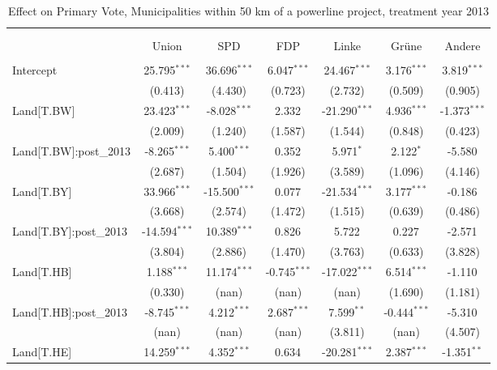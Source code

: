 \begin{table}[!htbp] \centering
  \caption{Effect on Primary Vote, Municipalities within 50 km of a powerline project, treatment year 2013}
\begin{tabular}{@{\extracolsep{5pt}}lcccccc}
\\[-1.8ex]\hline
\hline \\[-1.8ex]
\\[-1.8ex] & \multicolumn{1}{c}{Union} & \multicolumn{1}{c}{SPD} & \multicolumn{1}{c}{FDP} & \multicolumn{1}{c}{Linke} & \multicolumn{1}{c}{Grüne} & \multicolumn{1}{c}{Andere}  \\
\hline \\[-1.8ex]
 Intercept & 25.795$^{***}$ & 36.696$^{***}$ & 6.047$^{***}$ & 24.467$^{***}$ & 3.176$^{***}$ & 3.819$^{***}$ \\
  & (0.413) & (4.430) & (0.723) & (2.732) & (0.509) & (0.905) \\
 Land[T.BW] & 23.423$^{***}$ & -8.028$^{***}$ & 2.332$^{}$ & -21.290$^{***}$ & 4.936$^{***}$ & -1.373$^{***}$ \\
  & (2.009) & (1.240) & (1.587) & (1.544) & (0.848) & (0.423) \\
 Land[T.BW]:post_2013 & -8.265$^{***}$ & 5.400$^{***}$ & 0.352$^{}$ & 5.971$^{*}$ & 2.122$^{*}$ & -5.580$^{}$ \\
  & (2.687) & (1.504) & (1.926) & (3.589) & (1.096) & (4.146) \\
 Land[T.BY] & 33.966$^{***}$ & -15.500$^{***}$ & 0.077$^{}$ & -21.534$^{***}$ & 3.177$^{***}$ & -0.186$^{}$ \\
  & (3.668) & (2.574) & (1.472) & (1.515) & (0.639) & (0.486) \\
 Land[T.BY]:post_2013 & -14.594$^{***}$ & 10.389$^{***}$ & 0.826$^{}$ & 5.722$^{}$ & 0.227$^{}$ & -2.571$^{}$ \\
  & (3.804) & (2.886) & (1.470) & (3.763) & (0.633) & (3.828) \\
 Land[T.HB] & 1.188$^{***}$ & 11.174$^{***}$ & -0.745$^{***}$ & -17.022$^{***}$ & 6.514$^{***}$ & -1.110$^{}$ \\
  & (0.330) & (nan) & (nan) & (nan) & (1.690) & (1.181) \\
 Land[T.HB]:post_2013 & -8.745$^{***}$ & 4.212$^{***}$ & 2.687$^{***}$ & 7.599$^{**}$ & -0.444$^{***}$ & -5.310$^{}$ \\
  & (nan) & (nan) & (nan) & (3.811) & (nan) & (4.507) \\
 Land[T.HE] & 14.259$^{***}$ & 4.352$^{***}$ & 0.634$^{}$ & -20.281$^{***}$ & 2.387$^{***}$ & -1.351$^{**}$ \\

\end{tabular}
\end{table}
